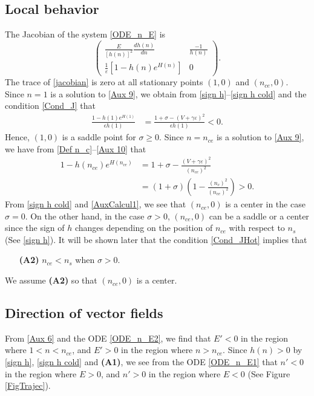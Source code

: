 \documentclass{amsart}
\newcommand{\veps}{\varepsilon}
\numberwithin{equation}{section}
\theoremstyle{plain}%
\theoremstyle{definition}
\theoremstyle{remark}
\theoremstyle{remark}
\begin{document}
\subsection{Local behavior}
The Jacobian of the system \eqref{ODE_n_E} is
\begin{equation}\label{jacobian}
\left( 
\begin{array}{cc}
\frac{E}{[h(n)]^2}\frac{dh(n)}{dn} & \frac{-1}{h(n)} \\
\frac{1}{\veps}\left[1-h(n)e^{H(n)} \right] & 0
\end{array}
\right).
\end{equation}
The trace of \eqref{jacobian} is zero at all stationary points $(1,0)$ and $(n_{ce},0)$. Since $n=1$ is a solution to \eqref{Aux 9}, we obtain from \eqref{sign h}--\eqref{sign h cold} and the condition \eqref{Cond_J} that
\[
\begin{split}
\frac{1 - h(1)e^{H(1)}}{\epsilon h(1)}
& = \frac{1+\sigma -(V+\gamma\veps)^2}{\epsilon h(1)} < 0.
\end{split}
\]
Hence, $(1,0)$ is a saddle point for $\sigma \geq 0$. Since $n=n_{ce}$ is a solution to \eqref{Aux 9}, we have from \eqref{Def n_c}--\eqref{Aux 10} that
\begin{equation}\label{AuxCalcul1}
\begin{split}
1 - h(n_{ce})e^{H(n_{ce})}
& = 1 + \sigma - \frac{(V+\gamma\veps)^2}{(n_{ce})^2}  \\
&  = (1 + \sigma)\left(1 -\frac{(n_c)^2}{(n_{ce})^2} \right) > 0.
\end{split}
\end{equation}
From \eqref{sign h cold} and \eqref{AuxCalcul1}, we see that $(n_{ce},0)$ is a center 
in the case $\sigma=0$. On the other hand, in the case $\sigma>0$, $(n_{ce},0)$ can be a saddle or a center since the sign of $h$ changes depending on the position of $n_{ce}$ with respect to $n_s$ (See \eqref{sign h}). It will be shown later that the condition \eqref{Cond_JHot} implies that
\begin{enumerate}
\item[\textbf{(A2)}] $n_{ce} < n_s$ when $\sigma>0$.
\end{enumerate}
We assume \textbf{(A2)} so that $(n_{ce},0)$ is a center.


\subsection{Direction of vector fields}
From \eqref{Aux 6} and the ODE \eqref{ODE_n_E2}, we find that $E'<0$ in the region where $ 1 < n < n_{ce}$, and $E' >0$ in the region where $n> n_{ce}$. Since $h(n)>0$ by \eqref{sign h}, \eqref{sign h cold} and \textbf{(A1)}, we see from the ODE \eqref{ODE_n_E1} that $n'<0$ in the region where $E>0$, and $n'>0$ in the region where $E<0$ (See Figure \ref{FigTrajec}).
\end{document}
